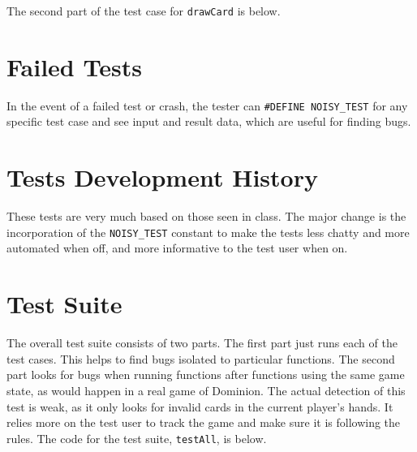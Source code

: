 \documentclass[letterpaper,12pt]{article}
\begin{document}
The second part of the test case for {\tt drawCard} is below.

\begin{scriptsize}

\end{scriptsize}


\section{Failed Tests}
In the event of a failed test or crash, the tester can
{\tt \#DEFINE NOISY\_TEST} for any specific test case and see input and result
data, which are useful for finding bugs.

\section{Tests Development History}
These tests are very much based on those seen in class. The major change is the
incorporation of the {\tt NOISY\_TEST} constant to make the tests less chatty
and more automated when off, and more informative to the test user when on.

\section{Test Suite}
The overall test suite consists of two parts. The first part just runs each of
the test cases. This helps to find bugs isolated to particular functions. The
second part looks for bugs when running functions after functions using the
same game state, as would happen in a real game of Dominion. The actual
detection of this test is weak, as it only looks for invalid cards in the
current player's hands. It relies more on the test user to track the game and
make sure it is following the rules. The code for the test suite,
{\tt testAll}, is below.

\begin{scriptsize}

\end{scriptsize}
\end{document}
